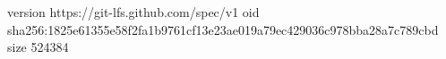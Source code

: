 version https://git-lfs.github.com/spec/v1
oid sha256:1825e61355e58f2fa1b9761cf13e23ae019a79ec429036c978bba28a7c789cbd
size 524384
